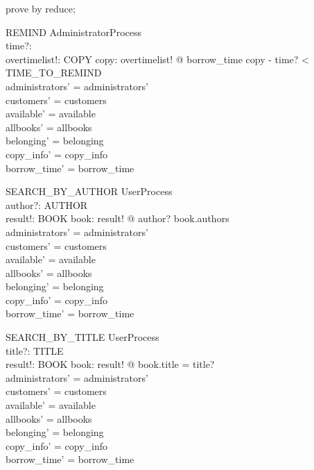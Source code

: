 \begin{zproof}
prove by reduce;
\end{zproof}

\begin{schema}{REMIND}
  AdministratorProcess\\
  time?: \nat \\
  overtimelist!: \power  COPY
\where
  \forall  copy: overtimelist! @ borrow\_time copy - time? < TIME\_TO\_REMIND\\
  administrators' = administrators'\\
  customers' = customers\\
  available' = available\\
  allbooks' = allbooks\\
  belonging' = belonging\\
  copy\_info' = copy\_info\\
  borrow\_time' = borrow\_time
\end{schema}

\begin{schema}{SEARCH\_BY\_AUTHOR}
  UserProcess\\
  author?: AUTHOR\\
  result!: \power  BOOK
\where
  \forall  book: result! @ author? \in  book.authors\\
  administrators' = administrators'\\
  customers' = customers\\
  available' = available\\
  allbooks' = allbooks\\
  belonging' = belonging\\
  copy\_info' = copy\_info\\
  borrow\_time' = borrow\_time
\end{schema}

\begin{schema}{SEARCH\_BY\_TITLE}
  UserProcess\\
  title?: TITLE\\
  result!: \power  BOOK
\where
  \forall  book: result! @ book.title = title?\\
  administrators' = administrators'\\
  customers' = customers\\
  available' = available\\
  allbooks' = allbooks\\
  belonging' = belonging\\
  copy\_info' = copy\_info\\
  borrow\_time' = borrow\_time
\end{schema}

